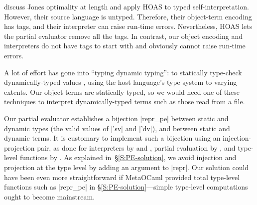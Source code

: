 \citet{Danvy-tagging-encoding} discuss Jones optimality at length and
apply HOAS to typed self\hyp interpretation.  However, their source
language is untyped.  Therefore, their object\hyp term encoding has
tags, and their interpreter can raise run-time errors.
Nevertheless, HOAS lets the partial
evaluator remove all the tags. In contrast, our object encoding and
interpreters do not have tags to start with and obviously cannot
raise run-time errors.

\ifshort\else
A lot of effort has gone into ``typing dynamic typing'': to statically
type-check dynamically\hyp typed values
\citep{baars-typing,WalidICFP02,Guillemette-Monier-PLPV,haskell-list},
using the host language's type system to varying extents.
Our object terms are statically typed, so we would
need one of these techniques to interpret dynamically\hyp typed
terms such as those read from a file.
\fi

Our partial evaluator establishes a bijection |repr_pe| between static
and dynamic types (the valid values of |'sv| and |'dv|), and between
static and dynamic terms.  It is customary to implement such a bijection
using an injection\hyp projection pair, as done for interpreters
\ifshort \citep{Ramsey-ML-module-mania,Benton-embedded-interpreters}\else
by \citet{Ramsey-ML-module-mania} and \citet{Benton-embedded-interpreters}\fi,
partial evaluation \ifshort \citep{Danvy-TDPE}\else by \citet{Danvy-TDPE}\fi,
and type-level functions \ifshort \citep{oliveira-typecase}\else by
\citet{oliveira-typecase}\fi.  As explained in~\S\ref{S:PE-solution}, we
avoid injection and projection at the type level by adding an argument
to |repr|.
Our solution could have been even more straightforward if MetaOCaml
provided total type-level functions such as |repr_pe| in
\S\ref{S:PE-solution}---simple type-level computations 
ought to become mainstream.

